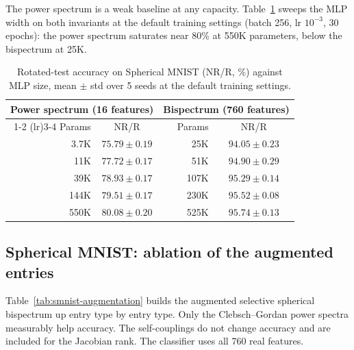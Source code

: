 \documentclass{article}
\theoremstyle{definition}
\theoremstyle{remark}
\theoremstyle{definition}
\begin{document}
The power spectrum is a weak baseline at any capacity. Table~\ref{tab:smnist-capacity} sweeps
the MLP width on both invariants at the default training settings (batch 256, lr $10^{-3}$,
30 epochs): the power spectrum saturates near 80\% at 550K parameters, below the bispectrum at
25K.

\begin{table}[h]
  \caption{Rotated-test accuracy on Spherical MNIST (NR/R, \%) against MLP size, mean $\pm$ std
    over 5 seeds at the default training settings.}
  \label{tab:smnist-capacity}
  \centering
  \small
  \begin{tabular}{rcrc}
    \toprule
    \multicolumn{2}{c}{Power spectrum (16 features)} & \multicolumn{2}{c}{Bispectrum (760 features)} \\
    \cmidrule(lr){1-2} \cmidrule(lr){3-4}
    Params & NR/R & Params & NR/R \\
    \midrule
    3.7K & $75.79 \pm 0.19$ & 25K  & $94.05 \pm 0.23$ \\
    11K  & $77.72 \pm 0.17$ & 51K  & $94.90 \pm 0.29$ \\
    39K  & $78.93 \pm 0.17$ & 107K & $95.29 \pm 0.14$ \\
    144K & $79.51 \pm 0.17$ & 230K & $95.52 \pm 0.08$ \\
    550K & $80.08 \pm 0.20$ & 525K & $95.74 \pm 0.13$ \\
    \bottomrule
  \end{tabular}
\end{table}

\subsection{Spherical MNIST: ablation of the augmented entries}
\label{app:smnist-ablation}

Table~\ref{tab:smnist-augmentation} builds the augmented selective spherical bispectrum up
entry type by entry type. Only the Clebsch--Gordan power spectra measurably help
accuracy. The self-couplings do not change accuracy and are included for the Jacobian rank.
The classifier uses all 760 real features.
\end{document}
